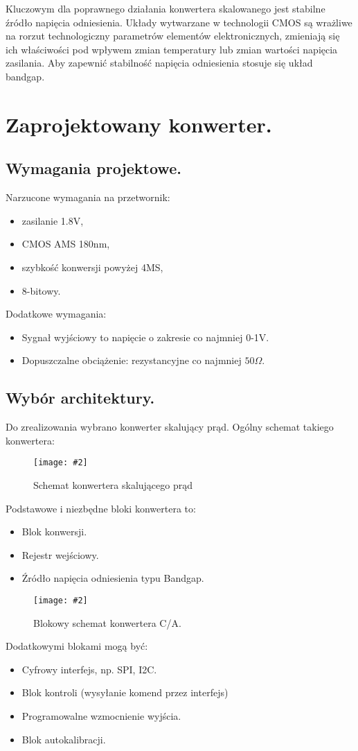 \documentclass[10pt,a4paper]{report}
\newcommand{\img}[4]{
	\begin{figure}[H]
		\begin{center}
			\texttt{[image: \#2]}
			\caption{#3}
			\label{#4}
		\end{center}
	\end{figure}
}
\begin{document}
	{	Kluczowym dla poprawnego działania konwertera skalowanego jest stabilne źródło napięcia odniesienia. Układy wytwarzane w technologii CMOS są wrażliwe na rorzut technologiczny parametrów elementów elektronicznych, zmieniają się ich właściwości pod wpływem zmian temperatury lub zmian wartości napięcia zasilania. Aby zapewnić stabilność napięcia odniesienia stosuje się układ bandgap. }

	\chapter{Zaprojektowany konwerter.}
	\section{Wymagania projektowe.}
	{	Narzucone wymagania na przetwornik:
		\begin{itemize}
			\item zasilanie 1.8V,
			\item CMOS AMS 180nm,
			\item szybkość konwersji powyżej 4MS,
			\item 8-bitowy.
		\end{itemize} }
	
	{	Dodatkowe wymagania:
		\begin{itemize}
			\item Sygnał wyjściowy to napięcie o zakresie co najmniej 0-1V.
			\item Dopuszczalne obciążenie: rezystancyjne co najmniej $50\Omega$.
		\end{itemize}
	}
	\section{Wybór architektury.}
	{	Do zrealizowania wybrano konwerter skalujący prąd. Ogólny schemat takiego konwertera:
		\img{20}{../visio/currentscale.pdf}{Schemat konwertera skalującego prąd}{currentscale}
	}

	{	Podstawowe i niezbędne bloki konwertera to:
		\begin{itemize}
			\item Blok konwersji.
			\item Rejestr wejściowy.
			\item Źródło napięcia odniesienia typu Bandgap.
		\end{itemize}
		\img{20}{../visio/blokschkonca.pdf}{Blokowy schemat konwertera C/A.}{blokschkonca}
		Dodatkowymi blokami mogą być:
		\begin{itemize}
			\item Cyfrowy interfejs, np. SPI, I2C.
			\item Blok kontroli (wysyłanie komend przez interfejs)
			\item Programowalne wzmocnienie wyjścia.
			\item Blok autokalibracji.
		\end{itemize}	
	}
\end{document}
